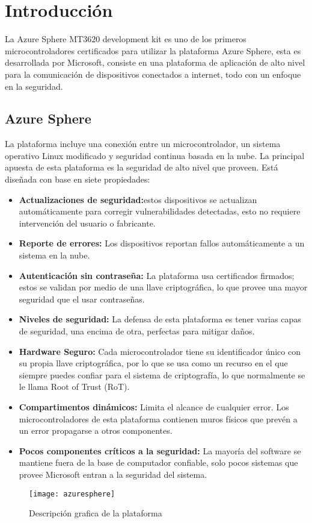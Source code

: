 \section{Introducción}

La Azure Sphere MT3620 development kit es uno de los primeros microcontroladores certificados para utilizar la plataforma Azure Sphere, esta es desarrollada por Microsoft, consiste en una plataforma de aplicación de alto nivel para la comunicación de dispositivos conectados a internet, todo con un enfoque en la seguridad.
\subsection{Azure Sphere}
La plataforma incluye una conexión entre un microcontrolador, un sistema operativo Linux modificado y seguridad continua basada en la nube. La principal apuesta de esta plataforma es la seguridad de alto nivel que proveen. Está diseñada con base en siete propiedades:
\begin{itemize}
	\item 
	\textbf{Actualizaciones de seguridad:}estos dispositivos se actualizan automáticamente para corregir vulnerabilidades detectadas, esto no requiere intervención del usuario o fabricante.
	\item 
	\textbf{Reporte de errores:} Los dispositivos reportan fallos automáticamente a un sistema en la nube.
	\item
	\textbf{Autenticación sin contraseña:} La plataforma usa certificados firmados; estos se validan por medio de una llave criptográfica, lo que provee una mayor seguridad que el usar contraseñas.
	\item
	\textbf{Niveles de seguridad:} La defensa de esta plataforma es tener varias capas de seguridad, una encima de otra, perfectas para mitigar daños.
	\item
	\textbf{Hardware Seguro:} Cada microcontrolador tiene su identificador único con su propia llave criptográfica, por lo que se usa como un recurso en el que siempre puedes confiar para el sistema de criptografía, lo que normalmente se le llama Root of Trust (RoT).
	\item
	\textbf{Compartimentos dinámicos:}  Limita el alcance de cualquier error. Los microcontroladores de esta plataforma contienen muros físicos que prevén a un error propagarse a otros componentes.
	\item
	\textbf{Pocos componentes críticos a la seguridad:} La mayoría del software se mantiene fuera de la base de computador confiable, solo pocos sistemas que provee Microsoft entran a la seguridad del sistema.
\end{itemize}
\begin{figure}[h]
	\centering
	\texttt{[image: azuresphere]}
	\caption{Descripción grafica de la plataforma}
\end{figure}